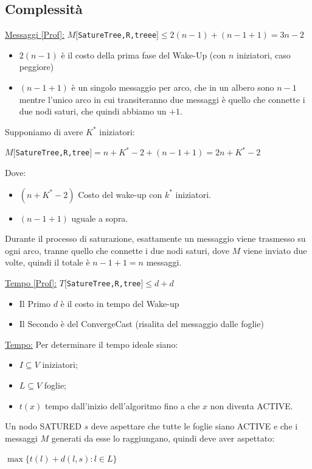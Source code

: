 \subsection{Complessità}
\underline{Messaggi [Prof]:}
$M[$\texttt{SatureTree,R,treee}$] \leq 2(n-1) + (n-1+1) = 3n - 2$
\begin{itemize}
    \item $2(n-1)$ è il costo della prima fase del Wake-Up (con $n$ iniziatori,
          caso peggiore)
    \item $(n-1+1)$ è un singolo messaggio per arco, che in un albero sono $n-1$
          mentre l'unico arco in cui transiteranno due messaggi è quello che
          connette i due nodi saturi, che quindi abbiamo un $+1$.
\end{itemize}
Supponiamo di avere $K^*$ iniziatori:
\begin{center}
    $M[$\texttt{SatureTree,R,tree}$] = n + K^* - 2 + (n-1+1) = 2n + K^* -2$\\
\end{center}
Dove:
\begin{itemize}
    \item $(n + K^* - 2)$ Costo del wake-up con $k^*$ iniziatori.
    \item $(n-1+1)$ uguale a sopra.
\end{itemize}

Durante il processo di saturazione, esattamente un messaggio viene trasmesso su
ogni arco, tranne quello che connette i due nodi saturi, dove $M$ viene inviato
due volte, quindi il totale è $n-1+1 = n$ messaggi.

\underline{Tempo [Prof]:}
$T[$\texttt{SatureTree,R,tree}$] \leq d + d$
\begin{itemize}
    \item Il Primo $d$ è il costo in tempo del Wake-up
    \item Il Secondo è del ConvergeCast (risalita del messaggio dalle foglie)
\end{itemize}
\underline{Tempo:}
Per determinare il tempo ideale siano:
\begin{itemize}
    \item $I \subseteq V$ iniziatori;
    \item $L \subseteq V$ foglie;
    \item $t(x)$ tempo dall'inizio dell'algoritmo fino a che $x$ non diventa
          ACTIVE.
\end{itemize}

Un nodo SATURED $s$ deve aspettare che tutte le foglie siano ACTIVE e che i
messaggi $M$ generati da esse lo raggiungano, quindi deve aver aspettato:
\begin{center}
    $\max \lbrace t(l) + d(l,s) : l \in L \rbrace$
\end{center}

